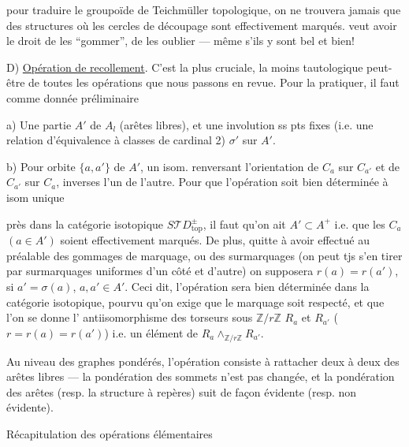 pour  traduire le groupoïde de Teichmüller topologique, on ne trouvera jamais que des structures où les cercles de découpage sont effectivement marqués.
 veut avoir le droit de les ``gommer'', de les oublier  --- même s'ils y sont bel et bien!

D) \uline{Opération de recollement}. C'est la plus cruciale, la moins tautologique peut-être de toutes les opérations que nous passons en revue.
Pour la pratiquer, il faut comme donnée préliminaire

a) Une partie  $A'$ de $A_l$ (arêtes libres), et une involution ss pts fixes (i.e. une relation d'équivalence à classes de cardinal 2) $\sigma'$ sur $A'$.

b) Pour   orbite  $\{a,a'\}$ de $A'$, un isom. renversant l'orientation de $C_a$ sur $C_{a'}$ et de $C_{a'}$ sur $C_a$, inverses l'un de l'autre.
Pour que l'opération soit bien déterminée à isom unique

près dans la catégorie isotopique $S\mathcal TD_{\mathrm{top}}^\pm$, il faut
 qu'on ait $A'\subset A^+$ i.e. que les $C_a$ $(a\in A')$ soient effectivement marqués.
De plus, quitte à avoir effectué au préalable des gommages de marquage, ou des surmarquages (on peut tjs s'en tirer par surmarquages uniformes d'un côté et d'autre) on supposera $r(a)=r(a')$, si $a'=\sigma(a)$, $a,a'\in A'$.
Ceci dit, l'opération sera bien déterminée dans la catégorie isotopique, pourvu qu'on  exige que le marquage soit respecté, et que l'on se donne l' antiisomorphisme des torseurs sous $\mathbb Z/r\mathbb Z$ $R_a$ et $R_{a'}$ ($r=r(a)=r(a')$) i.e. un élément de
$R_a\mathbin{\wedge}_{\mathbb Z/r\mathbb Z}R_{a'}$.

Au niveau des graphes pondérés, l'opération consiste à rattacher deux à deux  des arêtes libres --- la pondération des sommets n'est pas changée, et la pondération des arêtes (resp. la structure à repères) suit de façon  évidente (resp. non évidente).

Récapitulation des opérations élémentaires

